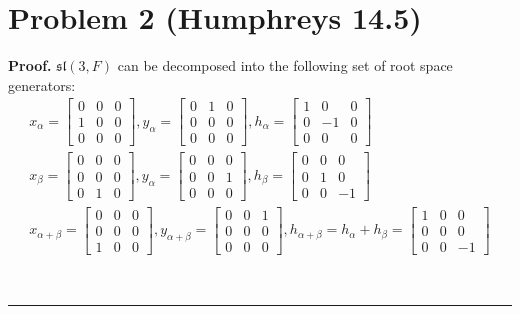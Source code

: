 \documentclass[12pt]{article}%
\newenvironment{proof}[1][Proof]{\textbf{#1.} }{\ \rule{0.5em}{0.5em}}
\begin{document}
\section*{Problem 2 (Humphreys 14.5)}
\begin{proof}
   $\mathfrak{sl}(3,F)$ can be decomposed into the following set of root space generators:
   \begin{gather*}
     x_{\alpha} = \begin{bmatrix} 0 & 0 & 0 \\ 1 & 0 & 0 \\ 0 & 0 & 0 \end{bmatrix}, y_{\alpha} = \begin{bmatrix} 0 & 1 & 0 \\ 0 & 0 & 0 \\ 0 & 0 & 0 \end{bmatrix}, h_{\alpha} = \begin{bmatrix} 1 & 0 & 0 \\ 0 & -1 & 0 \\ 0 & 0 & 0 \end{bmatrix} \\
     x_{\beta} = \begin{bmatrix} 0 & 0 & 0 \\ 0 & 0 & 0 \\ 0 & 1 & 0 \end{bmatrix}, y_{\alpha} = \begin{bmatrix} 0 & 0 & 0 \\ 0 & 0 & 1 \\ 0 & 0 & 0 \end{bmatrix}, h_{\beta} = \begin{bmatrix} 0 & 0 & 0 \\ 0 & 1 & 0 \\ 0 & 0 & -1 \end{bmatrix} \\
     x_{\alpha + \beta} =  \begin{bmatrix} 0 & 0 & 0 \\ 0 & 0 & 0 \\ 1 & 0 & 0 \end{bmatrix}, y_{\alpha + \beta} = \begin{bmatrix} 0 & 0 & 1 \\ 0 & 0 & 0 \\ 0 & 0 & 0 \end{bmatrix}, h_{\alpha + \beta} = h_{\alpha} + h_{\beta} = \begin{bmatrix} 1 & 0 & 0 \\ 0 & 0 & 0 \\ 0 & 0 & -1 \end{bmatrix}
   \end{gather*}


\end{proof}
\end{document}
